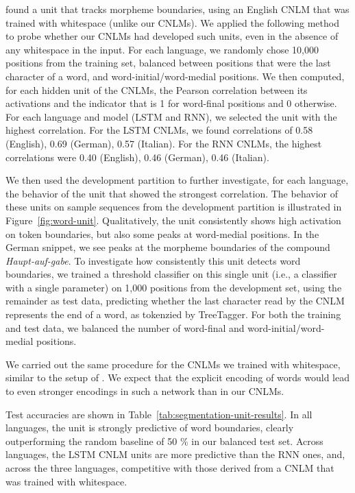  found a unit that tracks morpheme boundaries, using an English CNLM that was trained with whitespace (unlike our CNLMs).
We applied the following method to probe whether our CNLMs had developed such units, even in the absence of any whitespace in the input.
For each language, we randomly chose 10,000 positions from the training set, balanced between positions that were the last character of a word, and word-initial/word-medial positions.
We then computed, for each hidden unit of the CNLMs, the Pearson correlation between its activations and the indicator that is 1 for word-final positions and 0 otherwise.
For each language and model (LSTM and RNN), we selected the unit with the highest correlation.
For the LSTM CNLMs, we found correlations of 0.58 (English), 0.69 (German), 0.57 (Italian).
For the RNN CNLMs, the highest correlations were 0.40 (English), 0.46 (German), 0.46 (Italian).

We then used the development partition to further investigate, for each language, the behavior of the unit that showed the strongest correlation.
The behavior of these units on sample sequences from the development partition is illustrated in Figure~\ref{fig:word-unit}.
Qualitatively, the unit consistently shows high activation on token boundaries, but also some peaks at word-medial positions.
In the German snippet, we see peaks at the morpheme boundaries of the compound \emph{Haupt-auf-gabe}.
To investigate how consistently this unit detects word boundaries, we trained a threshold classifier on this single unit (i.e., a classifier with a single parameter) on 1,000 positions from the development set, using the remainder as test data, predicting whether the last character read by the CNLM represents the end of a word, as tokenzied by TreeTagger.
For both the training and test data, we balanced the number of word-final and word-initial/word-medial positions.

We carried out the same procedure for the CNLMs we trained with whitespace, similar to the setup of .
We expect that the explicit encoding of words would lead to even stronger encodings in such a network than in our CNLMs.

Test accuracies are shown in Table~\ref{tab:segmentation-unit-results}.
In all languages, the unit is strongly predictive of word boundaries, clearly outperforming the random baseline of 50 \% in our balanced test set.
Across languages, the LSTM CNLM units are more predictive than the RNN ones, and, across the three languages, competitive with those derived from a CNLM that was trained with whitespace.


